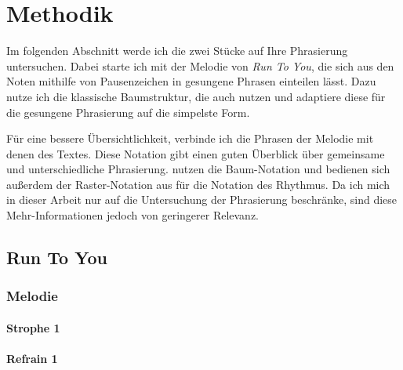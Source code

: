 \chapter{Methodik}
\label{chap:Methodik}
\pagestyle{plain}

Im folgenden Abschnitt werde ich die zwei Stücke auf Ihre Phrasierung untersuchen. Dabei starte ich mit der Melodie von \textit{Run To You}, die sich aus den Noten mithilfe von Pausenzeichen in gesungene Phrasen einteilen lässt. Dazu nutze ich die klassische Baumstruktur, die auch \cite{lerdahl1983generative} nutzen und adaptiere diese für die gesungene Phrasierung auf die simpelste Form.

Für eine bessere Übersichtlichkeit, verbinde ich die Phrasen der Melodie mit denen des Textes. Diese Notation gibt einen guten Überblick über gemeinsame und unterschiedliche Phrasierung. \cite{hayes1996role} nutzen die Baum-Notation und bedienen sich außerdem der Raster-Notation aus \cite{liberman1975intonational} für die Notation des Rhythmus. Da ich mich in dieser Arbeit nur auf die Untersuchung der Phrasierung beschränke, sind diese Mehr-Informationen jedoch von geringerer Relevanz.


\iffalse
\tiny 

\section*{Run To You}

\subsection*{Melodie}


\subsubsection*{Strophe 1}


\subsubsection*{Refrain 1}

